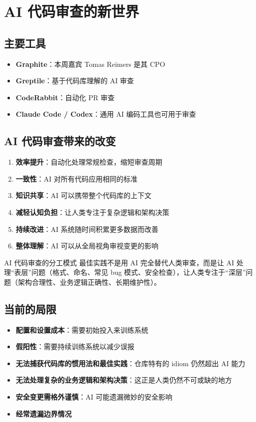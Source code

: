 \section{AI 代码审查的新世界}

\subsection{主要工具}

\begin{itemize}
    \item \textbf{Graphite}：本周嘉宾 Tomas Reimers 是其 CPO
    \item \textbf{Greptile}：基于代码库理解的 AI 审查
    \item \textbf{CodeRabbit}：自动化 PR 审查
    \item \textbf{Claude Code / Codex}：通用 AI 编码工具也可用于审查
\end{itemize}

\subsection{AI 代码审查带来的改变}

\begin{enumerate}
    \item \textbf{效率提升}：自动化处理常规检查，缩短审查周期
    \item \textbf{一致性}：AI 对所有代码应用相同的标准
    \item \textbf{知识共享}：AI 可以携带整个代码库的上下文
    \item \textbf{减轻认知负担}：让人类专注于复杂逻辑和架构决策
    \item \textbf{持续改进}：AI 系统随时间积累更多数据而改善
    \item \textbf{整体理解}：AI 可以从全局视角审视变更的影响
\end{enumerate}

\begin{knowledgebox}{AI 代码审查的分工模式}
最佳实践不是用 AI 完全替代人类审查，而是让 AI 处理``表层''问题（格式、命名、常见 bug 模式、安全检查），让人类专注于``深层''问题（架构合理性、业务逻辑正确性、长期维护性）。
\end{knowledgebox}

\subsection{当前的局限}

\begin{itemize}
    \item \textbf{配置和设置成本}：需要初始投入来训练系统
    \item \textbf{假阳性}：需要持续训练系统以减少误报
    \item \textbf{无法捕获代码库的惯用法和最佳实践}：仓库特有的 idiom 仍然超出 AI 能力
    \item \textbf{无法处理复杂的业务逻辑和架构决策}：这正是人类仍然不可或缺的地方
    \item \textbf{安全变更需格外谨慎}：AI 可能遗漏微妙的安全影响
    \item \textbf{经常遗漏边界情况}
\end{itemize}

